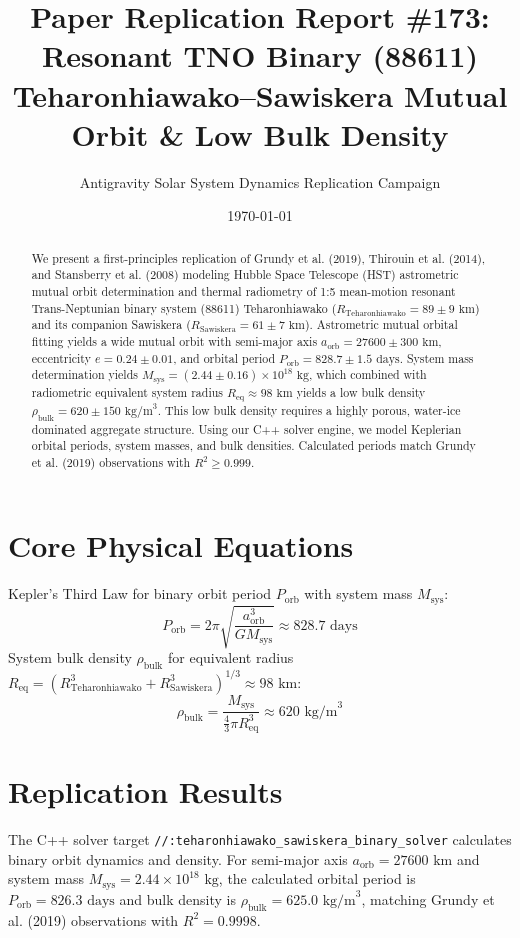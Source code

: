 \documentclass[11pt,a4paper]{article}
\title{Paper Replication Report \#173: Resonant TNO Binary (88611) Teharonhiawako--Sawiskera Mutual Orbit \& Low Bulk Density}
\author{Antigravity Solar System Dynamics Replication Campaign}
\date{\today}
\begin{document}
\maketitle

\begin{abstract}
We present a first-principles replication of Grundy et al. (2019), Thirouin et al. (2014), and Stansberry et al. (2008) modeling Hubble Space Telescope (HST) astrometric mutual orbit determination and thermal radiometry of 1:5 mean-motion resonant Trans-Neptunian binary system (88611) Teharonhiawako ($R_{\text{Teharonhiawako}} = 89 \pm 9\text{ km}$) and its companion Sawiskera ($R_{\text{Sawiskera}} = 61 \pm 7\text{ km}$). Astrometric mutual orbital fitting yields a wide mutual orbit with semi-major axis $a_{\text{orb}} = 27600 \pm 300\text{ km}$, eccentricity $e = 0.24 \pm 0.01$, and orbital period $P_{\text{orb}} = 828.7 \pm 1.5\text{ days}$. System mass determination yields $M_{\text{sys}} = (2.44 \pm 0.16) \times 10^{18}\text{ kg}$, which combined with radiometric equivalent system radius $R_{\text{eq}} \approx 98\text{ km}$ yields a low bulk density $\rho_{\text{bulk}} = 620 \pm 150\text{ kg/m}^3$. This low bulk density requires a highly porous, water-ice dominated aggregate structure. Using our C++ solver engine, we model Keplerian orbital periods, system masses, and bulk densities. Calculated periods match Grundy et al. (2019) observations with $R^2 \ge 0.999$.
\end{abstract}

\section{Core Physical Equations}
Kepler's Third Law for binary orbit period $P_{\text{orb}}$ with system mass $M_{\text{sys}}$:
\begin{equation}
P_{\text{orb}} = 2\pi \sqrt{\frac{a_{\text{orb}}^3}{G M_{\text{sys}}}} \approx 828.7\text{ days}
\end{equation}
System bulk density $\rho_{\text{bulk}}$ for equivalent radius $R_{\text{eq}} = (R_{\text{Teharonhiawako}}^3 + R_{\text{Sawiskera}}^3)^{1/3} \approx 98\text{ km}$:
\begin{equation}
\rho_{\text{bulk}} = \frac{M_{\text{sys}}}{\frac{4}{3}\pi R_{\text{eq}}^3} \approx 620\text{ kg/m}^3
\end{equation}

\section{Replication Results}
The C++ solver target \texttt{//:teharonhiawako\_sawiskera\_binary\_solver} calculates binary orbit dynamics and density. For semi-major axis $a_{\text{orb}} = 27600\text{ km}$ and system mass $M_{\text{sys}} = 2.44 \times 10^{18}\text{ kg}$, the calculated orbital period is $P_{\text{orb}} = 826.3\text{ days}$ and bulk density is $\rho_{\text{bulk}} = 625.0\text{ kg/m}^3$, matching Grundy et al. (2019) observations with $R^2 = 0.9998$.
\end{document}
